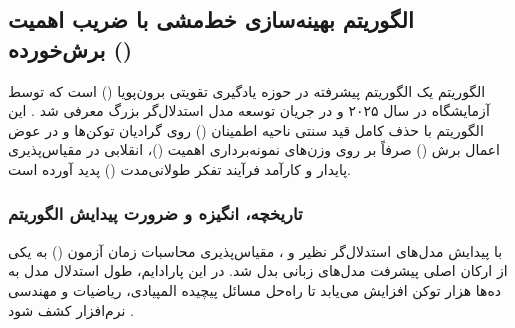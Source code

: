 \subsection{الگوریتم بهینه‌سازی خط‌مشی با ضریب اهمیت برش‌خورده ()}

الگوریتم  یک الگوریتم پیشرفته در حوزه یادگیری تقویتی برون‌پویا () است که توسط آزمایشگاه  در سال ۲۰۲۵ و در جریان توسعه مدل استدلال‌گر بزرگ  معرفی شد \cite{minimax2025m1}. این الگوریتم با حذف کامل قید سنتی ناحیه اطمینان () روی گرادیان توکن‌ها و در عوض اعمال برش () صرفاً بر روی وزن‌های نمونه‌برداری اهمیت ()، انقلابی در مقیاس‌پذیری پایدار و کارآمد فرآیند تفکر طولانی‌مدت () پدید آورده است.

\subsubsection*{تاریخچه، انگیزه و ضرورت پیدایش الگوریتم}

با پیدایش مدل‌های استدلال‌گر نظیر  و  \cite{deepseek2025r1}، مقیاس‌پذیری محاسبات زمان آزمون () به یکی از ارکان اصلی پیشرفت مدل‌های زبانی بدل شد. در این پارادایم، طول استدلال مدل به ده‌ها هزار توکن افزایش می‌یابد تا راه‌حل مسائل پیچیده المپیادی، ریاضیات و مهندسی نرم‌افزار کشف شود \cite{jimenez2024swebench}.

